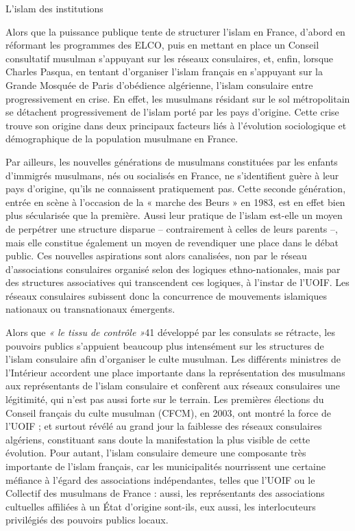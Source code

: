 L'islam des institutions


Alors que la puissance publique tente de structurer l'islam en France,
d'abord en réformant les programmes des ELCO, puis en mettant en place
un Conseil consultatif musulman s'appuyant sur les réseaux consulaires,
et, enfin, lorsque Charles Pasqua, en tentant d'organiser l'islam
français en s'appuyant sur la Grande Mosquée de Paris d'obédience
algérienne, l'islam consulaire entre progressivement en crise. En effet,
les musulmans résidant sur le sol métropolitain se détachent
progressivement de l'islam porté par les pays d'origine. Cette crise
trouve son origine dans deux principaux facteurs liés à l'évolution
sociologique et démographique de la population musulmane en France.

Par ailleurs, les nouvelles générations de musulmans constituées par les
enfants d'immigrés musulmans, nés ou socialisés en France, ne
s'identifient guère à leur pays d'origine, qu'ils ne connaissent
pratiquement pas. Cette seconde génération, entrée en scène à l'occasion
de la « marche des Beurs » en 1983, est en effet bien plus sécularisée
que la première. Aussi leur pratique de l'islam est-elle un moyen de
perpétrer une structure disparue -- contrairement à celles de leurs
parents --, mais elle constitue également un moyen de revendiquer une
place dans le débat public. Ces nouvelles aspirations sont alors
canalisées, non par le réseau d'associations consulaires organisé selon
des logiques ethno-nationales, mais par des structures associatives qui
transcendent ces logiques, à l'instar de l'UOIF. Les réseaux consulaires
subissent donc la concurrence de mouvements islamiques nationaux ou
transnationaux émergents.

Alors que \emph{« le tissu de contrôle »}41 développé par les consulats
se rétracte, les pouvoirs publics s'appuient beaucoup plus intensément
sur les structures de l'islam consulaire afin d'organiser le culte
musulman. Les différents ministres de l'Intérieur accordent une place
importante dans la représentation des musulmans aux représentants de
l'islam consulaire et confèrent aux réseaux consulaires une légitimité,
qui n'est pas aussi forte sur le terrain. Les premières élections du
Conseil français du culte musulman (CFCM), en 2003, ont montré la force
de l'UOIF ; et surtout révélé au grand jour la faiblesse des réseaux
consulaires algériens, constituant sans doute la manifestation la plus
visible de cette évolution. Pour autant, l'islam consulaire demeure une
composante très importante de l'islam français, car les municipalités
nourrissent une certaine méfiance à l'égard des associations
indépendantes, telles que l'UOIF ou le Collectif des musulmans de France
: aussi, les représentants des associations cultuelles affiliées à un
État d'origine sont-ils, eux aussi, les interlocuteurs privilégiés des
pouvoirs publics locaux.

